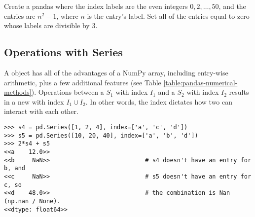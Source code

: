 \begin{comment} %
We can create a \li{Series} having constant values in the following manner:
\begin{lstlisting}
>>> val = 4     #desired constant value of Series
>>> n = 6       #desired length of Series
>>> s3 = pd.Series(val, index=np.arange(n))
>>> s3
0    4
1    4
2    4
3    4
4    4
5    4
dtype: int64
\end{lstlisting}
\end{comment}

\begin{problem}
Create a pandas  where the index labels are the even integers $0,2,\ldots,50$, and the entries are $n^2 - 1$, where $n$ is the entry's label.
Set all of the entries equal to zero whose labels are divisible by $3$.
\end{problem}

\subsection*{Operations with Series} %

A  object has all of the advantages of a NumPy array, including entry-wise arithmetic, plus a few additional features (see Table \ref{table:pandas-numerical-methods}).
Operations between a  $S_1$ with index $I_1$ and a  $S_2$ with index $I_2$ results in a new  with index $I_1\cup I_2$.
In other words, the index dictates how two  can interact with each other.

\begin{lstlisting}
>>> s4 = pd.Series([1, 2, 4], index=['a', 'c', 'd'])
>>> s5 = pd.Series([10, 20, 40], index=['a', 'b', 'd'])
>>> 2*s4 + s5
<<a    12.0>>
<<b     NaN>>                           # s4 doesn't have an entry for b, and
<<c     NaN>>                           # s5 doesn't have an entry for c, so
<<d    48.0>>                           # the combination is Nan (np.nan / None).
<<dtype: float64>>
\end{lstlisting}

